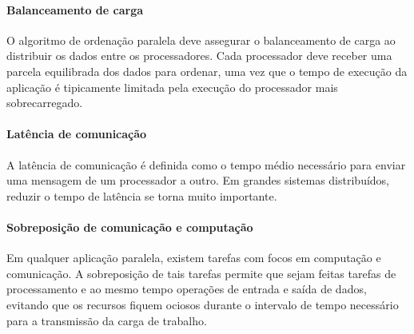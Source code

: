 \paragraph*{Balanceamento de carga}
O algoritmo de ordenação paralela deve assegurar o balanceamento de carga ao distribuir os dados entre os processadores. Cada processador deve receber uma parcela equilibrada dos dados para ordenar, uma vez que o tempo de execução da aplicação é tipicamente limitada pela execução do processador mais sobrecarregado.

\paragraph*{Latência de comunicação}
A latência de comunicação é definida como o tempo médio necessário para enviar uma mensagem de um processador a outro.
Em grandes sistemas distribuídos, reduzir o tempo de latência se torna muito importante.

\paragraph*{Sobreposição de comunicação e computação}
Em qualquer aplicação paralela, existem tarefas com focos em computação e comunicação. A sobreposição de tais tarefas permite que sejam feitas tarefas de processamento e ao mesmo tempo operações de entrada e saída de dados, evitando que os recursos fiquem ociosos durante o intervalo de tempo necessário para a transmissão da carga de trabalho.

